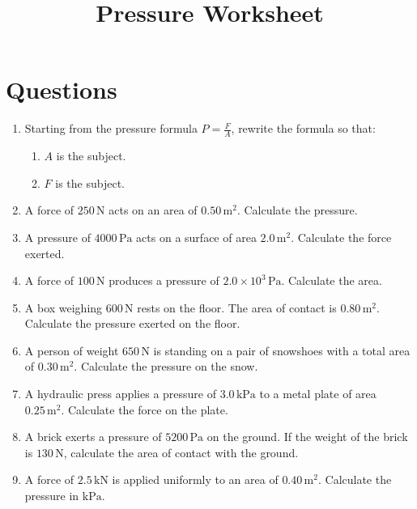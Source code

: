 \documentclass[12pt]{article}
\title{Pressure Worksheet}
\date{}
\begin{document}
\maketitle

\section*{Questions}
\begin{enumerate}
\item Starting from the pressure formula \(P = \frac{F}{A}\), rewrite the formula so that:
    \begin{enumerate}
        \item \(A\) is the subject.
        \item \(F\) is the subject.
    \end{enumerate}

\item A force of \(250\,\text{N}\) acts on an area of \(0.50\,\text{m}^2\). Calculate the pressure.

\item A pressure of \(4000\,\text{Pa}\) acts on a surface of area \(2.0\,\text{m}^2\). Calculate the force exerted.

\item A force of \(100\,\text{N}\) produces a pressure of \(2.0\times10^{3}\,\text{Pa}\). Calculate the area.

\item A box weighing \(600\,\text{N}\) rests on the floor. The area of contact is \(0.80\,\text{m}^2\). Calculate the pressure exerted on the floor.

\item A person of weight \(650\,\text{N}\) is standing on a pair of snowshoes with a total area of \(0.30\,\text{m}^2\). Calculate the pressure on the snow.

\item A hydraulic press applies a pressure of \(3.0\,\text{kPa}\) to a metal plate of area \(0.25\,\text{m}^2\). Calculate the force on the plate.

\item A brick exerts a pressure of \(5200\,\text{Pa}\) on the ground. If the weight of the brick is \(130\,\text{N}\), calculate the area of contact with the ground.

\item A force of \(2.5\,\text{kN}\) is applied uniformly to an area of \(0.40\,\text{m}^2\). Calculate the pressure in \(\text{kPa}\).


\end{enumerate}
\end{document}
